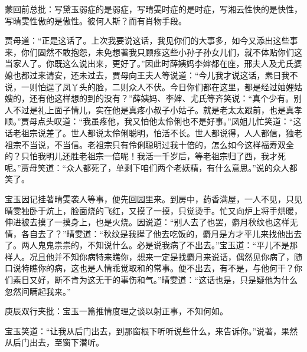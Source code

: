 \begin{parag}
    \begin{note}蒙回前总批：写黛玉弱症的是弱症，写晴雯时症的是时症，写湘云性快的是快性，写晴雯性傲的是傲性。彼何人斯？而有肖物手段。\end{note}
\end{parag}


\begin{parag}
    贾母道：“正是这话了。上次我要说这话，我见你们的大事多，如今又添出这些事来，你们固然不敢抱怨，未免想著我只顾疼这些小孙子孙女儿们，就不体贴你们这当家人了。你既这么说出来，更好了。”因此时薛姨妈李婶都在座，邢夫人及尤氏婆媳也都过来请安，还未过去，贾母向王夫人等说道：“今儿我才说这话，素日我不说，一则怕逞了凤丫头的脸，二则众人不伏。今日你们都在这里，都是经过妯娌姑嫂的，还有他这样想的到的没有？”薛姨妈、李婶、尤氏等齐笑说：“真个少有。别人不过是礼上面子情儿，实在他是真疼小叔子小姑子。就是老太太跟前，也是真孝顺。”贾母点头叹道：“我虽疼他，我又怕他太伶俐也不是好事。”凤姐儿忙笑道：“这话老祖宗说差了。世人都说太伶俐聪明，怕活不长。世人都说得，人人都信，独老祖宗不当说，不当信。老祖宗只有伶俐聪明过我十倍的，怎么如今这样福寿双全的？只怕我明儿还胜老祖宗一倍呢！我活一千岁后，等老祖宗归了西，我才死呢。”贾母笑道：“众人都死了，单剩下咱们两个老妖精，有什么意思。”说的众人都笑了。
\end{parag}


\begin{parag}
    宝玉因记挂著晴雯袭人等事，便先回园里来。到房中，药香满屋，一人不见，只见晴雯独卧于炕上，脸面烧的飞红，又摸了一摸，只觉烫手。忙又向炉上将手烘暖，伸进被去摸了一摸身上，也是火烧。因说道：“别人去了也罢，麝月秋纹也这样无情，各自去了？”晴雯道：“秋纹是我撵了他去吃饭的，麝月是方才平儿来找他出去了。两人鬼鬼祟祟的，不知说什么。必是说我病了不出去。”宝玉道：“平儿不是那样人。况且他并不知你病特来瞧你，想来一定是找麝月来说话，偶然见你病了，随口说特瞧你的病，这也是人情乖觉取和的常事。便不出去，有不是，与他何干？你们素日又好，断不肯为这无干的事伤和气。”晴雯道：“这话也是，只是疑他为什么忽然间瞒起我来。”\begin{note}庚辰双行夹批：宝玉一篇推情度理之谈以射正事，不知何如。\end{note}宝玉笑道：“让我从后门出去，到那窗根下听听说些什么，来告诉你。”说著，果然从后门出去，至窗下潜听。
\end{parag}


